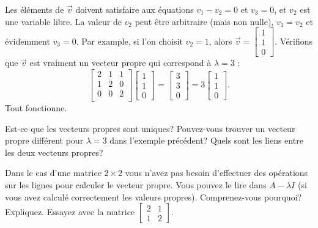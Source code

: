\begin{example}
Les éléments de $\vec{v}$ doivent satisfaire aux équations
$v_1 - v_2 = 0$ et $v_3 = 0$, et $v_2$ est une variable libre. La valeur de $v_2$ peut être arbitraire (mais non nulle),
$v_1 = v_2$ et évidemment $v_3 = 0$.
Par example, si l'on choisit $v_2 = 1$, alors
$\vec{v} =
\left[ \begin{smallmatrix} 1 \\ 1 \\ 0 \end{smallmatrix} \right]$.
Vérifions que $\vec{v}$ est vraiment un vecteur propre qui correspond à $\lambda = 3$ :
\begin{equation*}
\begin{bmatrix}
2 & 1 & 1 \\
1 & 2 & 0 \\
0 & 0 & 2 \\
\end{bmatrix}
\begin{bmatrix}
1 \\
1 \\
0
\end{bmatrix}
=
\begin{bmatrix}
3 \\
3 \\
0
\end{bmatrix}
=
3
\begin{bmatrix}
1 \\
1 \\
0
\end{bmatrix} .
\end{equation*}
Tout fonctionne.
\end{example}

\begin{exercise}[facile]
Est-ce que les vecteurs propres sont uniques? Pouvez-vous trouver un vecteur propre différent pour $\lambda = 3$ dans l’exemple précédent? Quels sont les liens entre les deux vecteurs propres?
\end{exercise}

\begin{exercise}
Dans le cas d’une matrice $2 \times 2$ vous n’avez pas besoin d'effectuer des opérations sur les lignes pour calculer le vecteur propre. Vous pouvez le lire dans $A-\lambda I$
(si vous avez calculé correctement les valeurs propres). Comprenez-vous pourquoi? Expliquez. Essayez avec la matrice
$\left[ \begin{smallmatrix} 2 & 1 \\ 1 & 2 \end{smallmatrix} \right]$.
\end{exercise}

